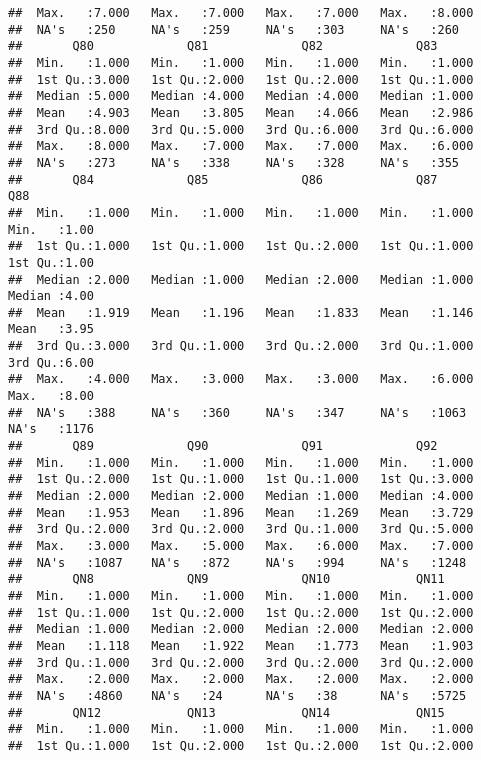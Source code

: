 \documentclass[
]{article}
\begin{document}
\begin{verbatim}
##  Max.   :7.000   Max.   :7.000   Max.   :7.000   Max.   :8.000  
##  NA's   :250     NA's   :259     NA's   :303     NA's   :260    
##       Q80             Q81             Q82             Q83       
##  Min.   :1.000   Min.   :1.000   Min.   :1.000   Min.   :1.000  
##  1st Qu.:3.000   1st Qu.:2.000   1st Qu.:2.000   1st Qu.:1.000  
##  Median :5.000   Median :4.000   Median :4.000   Median :1.000  
##  Mean   :4.903   Mean   :3.805   Mean   :4.066   Mean   :2.986  
##  3rd Qu.:8.000   3rd Qu.:5.000   3rd Qu.:6.000   3rd Qu.:6.000  
##  Max.   :8.000   Max.   :7.000   Max.   :7.000   Max.   :6.000  
##  NA's   :273     NA's   :338     NA's   :328     NA's   :355    
##       Q84             Q85             Q86             Q87             Q88      
##  Min.   :1.000   Min.   :1.000   Min.   :1.000   Min.   :1.000   Min.   :1.00  
##  1st Qu.:1.000   1st Qu.:1.000   1st Qu.:2.000   1st Qu.:1.000   1st Qu.:1.00  
##  Median :2.000   Median :1.000   Median :2.000   Median :1.000   Median :4.00  
##  Mean   :1.919   Mean   :1.196   Mean   :1.833   Mean   :1.146   Mean   :3.95  
##  3rd Qu.:3.000   3rd Qu.:1.000   3rd Qu.:2.000   3rd Qu.:1.000   3rd Qu.:6.00  
##  Max.   :4.000   Max.   :3.000   Max.   :3.000   Max.   :6.000   Max.   :8.00  
##  NA's   :388     NA's   :360     NA's   :347     NA's   :1063    NA's   :1176  
##       Q89             Q90             Q91             Q92       
##  Min.   :1.000   Min.   :1.000   Min.   :1.000   Min.   :1.000  
##  1st Qu.:2.000   1st Qu.:1.000   1st Qu.:1.000   1st Qu.:3.000  
##  Median :2.000   Median :2.000   Median :1.000   Median :4.000  
##  Mean   :1.953   Mean   :1.896   Mean   :1.269   Mean   :3.729  
##  3rd Qu.:2.000   3rd Qu.:2.000   3rd Qu.:1.000   3rd Qu.:5.000  
##  Max.   :3.000   Max.   :5.000   Max.   :6.000   Max.   :7.000  
##  NA's   :1087    NA's   :872     NA's   :994     NA's   :1248   
##       QN8             QN9             QN10            QN11      
##  Min.   :1.000   Min.   :1.000   Min.   :1.000   Min.   :1.000  
##  1st Qu.:1.000   1st Qu.:2.000   1st Qu.:2.000   1st Qu.:2.000  
##  Median :1.000   Median :2.000   Median :2.000   Median :2.000  
##  Mean   :1.118   Mean   :1.922   Mean   :1.773   Mean   :1.903  
##  3rd Qu.:1.000   3rd Qu.:2.000   3rd Qu.:2.000   3rd Qu.:2.000  
##  Max.   :2.000   Max.   :2.000   Max.   :2.000   Max.   :2.000  
##  NA's   :4860    NA's   :24      NA's   :38      NA's   :5725   
##       QN12            QN13            QN14            QN15      
##  Min.   :1.000   Min.   :1.000   Min.   :1.000   Min.   :1.000  
##  1st Qu.:1.000   1st Qu.:2.000   1st Qu.:2.000   1st Qu.:2.000  

\end{verbatim}
\end{document}
